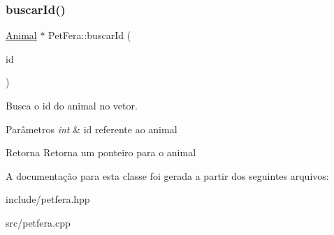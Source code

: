 \subsubsection{\texorpdfstring{buscar\+Id()}{buscarId()}}
{\footnotesize\ttfamily \hyperlink{classAnimal}{Animal} $\ast$ Pet\+Fera\+::buscar\+Id (\begin{DoxyParamCaption}\item[{int}]{id }\end{DoxyParamCaption})}



Busca o id do animal no vetor. 


\begin{DoxyParams}{Parâmetros}
{\em int} & id referente ao animal \\
\hline
\end{DoxyParams}
\begin{DoxyReturn}{Retorna}
Retorna um ponteiro para o animal 
\end{DoxyReturn}


A documentação para esta classe foi gerada a partir dos seguintes arquivos\+:\begin{DoxyCompactItemize}
\item 
include/petfera.\+hpp\item 
src/petfera.\+cpp\end{DoxyCompactItemize}
